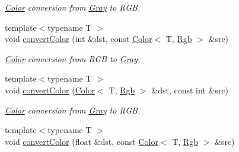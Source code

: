 \begin{DoxyCompactItemize}
\begin{DoxyCompactList}\small\item\em \hyperlink{class_d_o_1_1_color}{Color} conversion from \hyperlink{struct_d_o_1_1_gray}{Gray} to R\-G\-B. \end{DoxyCompactList}\item 
\hypertarget{group___color_conversion_ga503b181247cf148267c36db74329c655}{{\footnotesize template$<$typename T $>$ }\\void \hyperlink{group___color_conversion_ga503b181247cf148267c36db74329c655}{convert\-Color} (int \&dst, const \hyperlink{class_d_o_1_1_color}{Color}$<$ T, \hyperlink{group___color_space_gaad92fea51e98e11252ac86f2c8665d13}{Rgb} $>$ \&src)}\label{group___color_conversion_ga503b181247cf148267c36db74329c655}

\begin{DoxyCompactList}\small\item\em \hyperlink{class_d_o_1_1_color}{Color} conversion from R\-G\-B to \hyperlink{struct_d_o_1_1_gray}{Gray}. \end{DoxyCompactList}\item 
\hypertarget{group___color_conversion_gab85cc40825c116643b2bfe8ed890e2b5}{{\footnotesize template$<$typename T $>$ }\\void \hyperlink{group___color_conversion_gab85cc40825c116643b2bfe8ed890e2b5}{convert\-Color} (\hyperlink{class_d_o_1_1_color}{Color}$<$ T, \hyperlink{group___color_space_gaad92fea51e98e11252ac86f2c8665d13}{Rgb} $>$ \&dst, const int \&src)}\label{group___color_conversion_gab85cc40825c116643b2bfe8ed890e2b5}

\begin{DoxyCompactList}\small\item\em \hyperlink{class_d_o_1_1_color}{Color} conversion from \hyperlink{struct_d_o_1_1_gray}{Gray} to R\-G\-B. \end{DoxyCompactList}\item 
\hypertarget{group___color_conversion_ga63067bbe79b68f1aca280be0751d9245}{{\footnotesize template$<$typename T $>$ }\\void \hyperlink{group___color_conversion_ga63067bbe79b68f1aca280be0751d9245}{convert\-Color} (float \&dst, const \hyperlink{class_d_o_1_1_color}{Color}$<$ T, \hyperlink{group___color_space_gaad92fea51e98e11252ac86f2c8665d13}{Rgb} $>$ \&src)}\label{group___color_conversion_ga63067bbe79b68f1aca280be0751d9245}


\end{DoxyCompactItemize}
